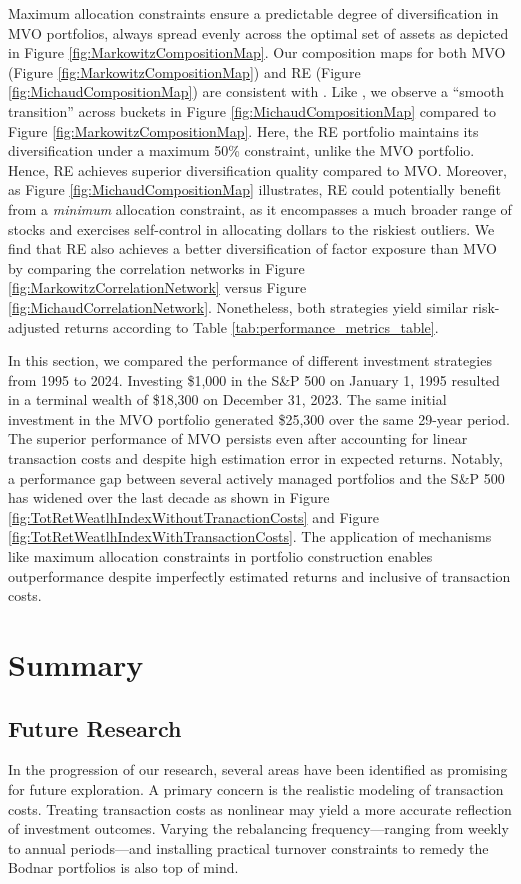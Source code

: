 \documentclass[12pt,letterpaper]{article}
\begin{document}
Maximum allocation constraints ensure a predictable degree of diversification in MVO portfolios, always spread evenly across the optimal set of assets as depicted in Figure \ref{fig:MarkowitzCompositionMap}. Our composition maps for both MVO (Figure \ref{fig:MarkowitzCompositionMap}) and RE (Figure \ref{fig:MichaudCompositionMap}) are consistent with . Like , we observe a “smooth transition” across buckets in Figure \ref{fig:MichaudCompositionMap} compared to Figure \ref{fig:MarkowitzCompositionMap}. Here, the RE portfolio maintains its diversification under a maximum 50\% constraint, unlike the MVO portfolio. Hence, RE achieves superior diversification quality compared to MVO. Moreover, as Figure \ref{fig:MichaudCompositionMap} illustrates, RE could potentially benefit from a \textit{minimum} allocation constraint, as it encompasses a much broader range of stocks and exercises self-control in allocating dollars to the riskiest outliers. We find that RE also achieves a better diversification of factor exposure than MVO by comparing the correlation networks in Figure \ref{fig:MarkowitzCorrelationNetwork} versus Figure \ref{fig:MichaudCorrelationNetwork}. Nonetheless, both strategies yield similar risk-adjusted returns according to Table \ref{tab:performance_metrics_table}.

In this section, we compared the performance of different investment strategies from 1995 to 2024. Investing \$1,000 in the S\&P 500 on January 1, 1995 resulted in a terminal wealth of \$18,300 on December 31, 2023. The same initial investment in the MVO portfolio generated \$25,300 over the same 29-year period. The superior performance of MVO persists even after accounting for linear transaction costs and despite high estimation error in expected returns. Notably, a performance gap between several actively managed portfolios and the S\&P 500 has widened over the last decade as shown in Figure \ref{fig:TotRetWeatlhIndexWithoutTranactionCosts} and Figure \ref{fig:TotRetWeatlhIndexWithTransactionCosts}. The application of mechanisms like maximum allocation constraints in portfolio construction enables outperformance despite imperfectly estimated returns and inclusive of transaction costs.

\section{Summary}

\subsection{Future Research}
In the progression of our research, several areas have been identified as promising for future exploration. A primary concern is the realistic modeling of transaction costs. Treating transaction costs as nonlinear may yield a more accurate reflection of investment outcomes. Varying the rebalancing frequency---ranging from weekly to annual periods---and installing practical turnover constraints to remedy the Bodnar portfolios is also top of mind.
\end{document}

